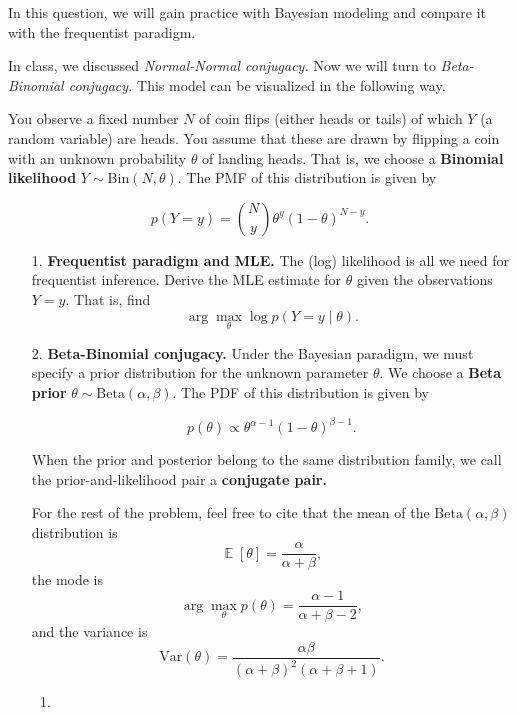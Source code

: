 \documentclass[submit]{harvardml}
\DeclareMathOperator*{\mean}{\mathbb{E}}
\begin{document}
\begin{problem}

In this question, we will gain practice with Bayesian modeling and
compare it with the frequentist paradigm.

In class, we discussed \emph{Normal-Normal conjugacy.} Now
we will turn to \emph{Beta-Binomial conjugacy.} This model can be
visualized in the following way.

You observe a fixed number \(N\) of coin flips (either
heads or tails) of which \(Y\) (a random variable) are heads. You assume that these are
drawn by flipping a coin with an unknown probability \(\theta\) of
landing heads. That is, we choose a \textbf{Binomial likelihood}
\(Y \sim \mathrm{Bin}(N, \theta)\). The PMF of this distribution is
given by

\[
  p(Y=y) = {N \choose y} \theta^{y} (1-\theta)^{N-y}.
\]

\begin{enumerate}
  \item[1.]
    \textbf{Frequentist paradigm and MLE.} The (log) likelihood is all we
    need for frequentist inference. Derive the MLE estimate for \(\theta\)
    given the observations \(Y = y\). That is, find
    \[\arg \max_{\theta} \log p(Y = y \mid \theta).\]

  \item[2.]
    \textbf{Beta-Binomial conjugacy.} Under the Bayesian paradigm, we must specify a
    prior distribution for the unknown parameter \(\theta\). We choose a \textbf{Beta prior}
    \(\theta \sim \mathrm{Beta}(\alpha, \beta)\). The PDF of this
    distribution is given by

    \[
      p(\theta) \propto \theta^{\alpha - 1} (1-\theta)^{\beta - 1}.
    \]

    When the prior and posterior belong to the same distribution family, we
    call the prior-and-likelihood pair a \textbf{conjugate pair.}

    For the rest of the problem, feel free to cite that the mean of the \(\mathrm{Beta}(\alpha, \beta)\) distribution is
    \[\mean[\theta] = \frac{\alpha}{\alpha+\beta},\]
    the mode is
    \[\arg\max_\theta p(\theta) = \frac{\alpha-1}{\alpha+\beta-2},\]
    and the variance is
    \[
      \mathrm{Var}(\theta) = \frac{\alpha \beta}{(\alpha + \beta)^2 (\alpha + \beta + 1)}.
    \]

    \begin{enumerate}
      \item


\end{enumerate}
\end{enumerate}
\end{problem}
\end{document}
